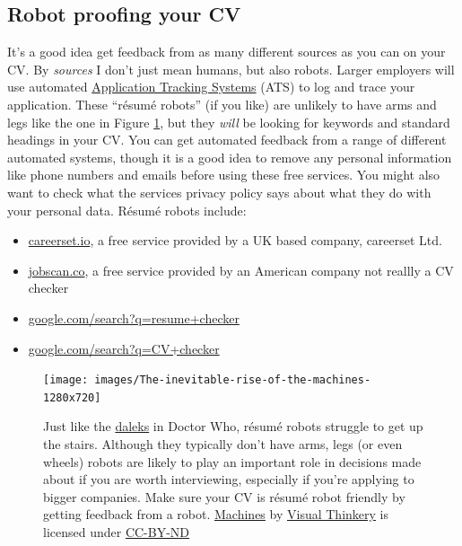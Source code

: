 \documentclass[
]{book}
\providecommand{\tightlist}{%
  \setlength{\itemsep}{0pt}\setlength{\parskip}{0pt}}
\begin{document}
\hypertarget{robotproof}{%
\subsection{Robot proofing your CV}\label{robotproof}}

It's a good idea get feedback from as many different sources as you can on your CV. By \emph{sources} I don't just mean humans, but also robots. Larger employers will use automated \href{https://en.wikipedia.org/wiki/Applicant_tracking_system}{Application Tracking Systems} (ATS) to log and trace your application. These ``résumé robots'' (if you like) are unlikely to have arms and legs like the one in Figure \ref{fig:machines-fig}, but they \emph{will} be looking for keywords and standard headings in your CV. You can get automated feedback from a range of different automated systems, though it is a good idea to remove any personal information like phone numbers and emails before using these free services. You might also want to check what the services privacy policy says about what they do with your personal data. Résumé robots include:

\begin{itemize}
\tightlist
\item
  \href{https://careerset.io}{careerset.io}, a free service provided by a UK based company, careerset Ltd.
\item
  \href{https://www.jobscan.co}{jobscan.co}, a free service provided by an American company not reallly a CV checker
\item
  \href{https://www.google.com/search?q=resume+checker}{google.com/search?q=resume+checker}
\item
  \href{https://www.google.com/search?q=cv+checker}{google.com/search?q=CV+checker}
\end{itemize}

\begin{figure}

{\centering \texttt{[image: images/The-inevitable-rise-of-the-machines-1280x720]} 

}

\caption{Just like the \href{https://en.wikipedia.org/wiki/Dalek}{daleks} in Doctor Who, résumé robots struggle to get up the stairs. Although they typically don't have arms, legs (or even wheels) robots are likely to play an important role in decisions made about if you are worth interviewing, especially if you're applying to bigger companies. Make sure your CV is résumé robot friendly by getting feedback from a robot. \href{https://bryanmmathers.com/machines/}{Machines} by \href{https://visualthinkery.com/}{Visual Thinkery} is licensed under \href{https://creativecommons.org/licenses/by-nd/4.0/}{CC-BY-ND}}\label{fig:machines-fig}
\end{figure}
\end{document}
